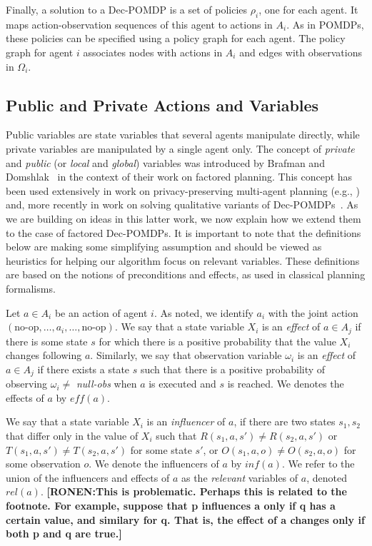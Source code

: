 \documentclass[letterpaper]{article} %
\newcommand{\eliran}[1]{\textbf{[\color{red}ELIRAN:#1]}}
\newcommand{\ronen}[1]{\textbf{[\color{blue}RONEN:#1]}}
\begin{document}
Finally, a solution to a Dec-POMDP is a set of policies $\rho_i$, one for each agent. It maps action-observation sequences of this agent to actions in $A_i$.
As in POMDPs, these policies can be specified using a policy graph for each agent. The policy graph for agent $i$ associates nodes with actions in $A_i$
and edges with observations in $\Omega_i$. 

\subsection{Public and Private Actions and Variables}

Public variables are state variables that several agents manipulate directly, while private variables are manipulated by a single agent only. The concept of \emph{private} and \emph{public} (or \emph{local} and \emph{global}) variables was introduced by
Brafman and Domshlak~\cite{} in the context of their work on factored planning. This concept has been used extensively
in work on privacy-preserving multi-agent planning (e.g., \cite{}) and, more recently in work on solving qualitative variants of Dec-POMDPs~\cite{}. As we are building on ideas in this latter work, we now explain how we extend them to the
case of factored Dec-POMDPs. It is important to note that the definitions below are making some simplifying assumption and should be viewed as heuristics for helping our algorithm focus on relevant variables. These definitions are based on the notions of
preconditions and effects, as used in classical planning formalisms.



Let $a\in A_i$ be an action of agent $i$. As noted, we identify $a_i$ with the joint action $(\mbox{no-op},\ldots, a_i,\ldots,\mbox{no-op})$.
We say that a state variable $X_i$ is an {\em effect} of $a\in A_j$ if there is some state $s$ for which there is a positive probability that the value 
$X_i$ changes following $a$.
Similarly, we say that observation variable $\omega_i$ is an {\em effect} of $a\in A_j$ if there exists a state $s$ such that there is a positive probability
of observing $\omega_i \neq$ {\em null-obs} when $a$ is executed and $s$ is reached. We denotes the effects of $a$ by $eff(a)$.

We say that a state variable $X_i$ is an
{\em influencer} of $a$, if there are two states $s_1,s_2$ that differ only in the value of $X_i$ such that $R(s_1,a,s')\neq R(s_2,a,s')$ or $T(s_1,a,s')\neq T(s_2,a,s')$ for some state $s'$, or $O(s_1,a,o)\neq O(s_2,a,o)$ for some observation $o$.
We denote the influencers of $a$ by
$inf(a)$.
We refer to the union of the influencers and effects of $a$ as
the {\em relevant} variables of $a$,
denoted $rel(a)$.
\ronen{This is problematic. Perhaps this is related to the footnote. For example, suppose that p influences a only if q has a certain value, and similary for q. That is, the effect of a changes only if both p and q are true.}
\end{document}
